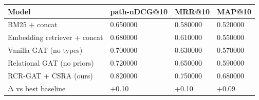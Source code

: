 \begin{tabular}{llll}
\toprule
Model & path-nDCG@10 & MRR@10 & MAP@10 \\
\midrule
BM25 + concat & 0.650000 & 0.580000 & 0.520000 \\
Embedding retriever + concat & 0.680000 & 0.610000 & 0.550000 \\
Vanilla GAT (no types) & 0.700000 & 0.630000 & 0.570000 \\
Relational GAT (no priors) & 0.720000 & 0.650000 & 0.590000 \\
RCR-GAT + CSRA (ours) & 0.820000 & 0.750000 & 0.680000 \\
Δ vs best baseline & +0.10 & +0.10 & +0.09 \\
\bottomrule
\end{tabular}
